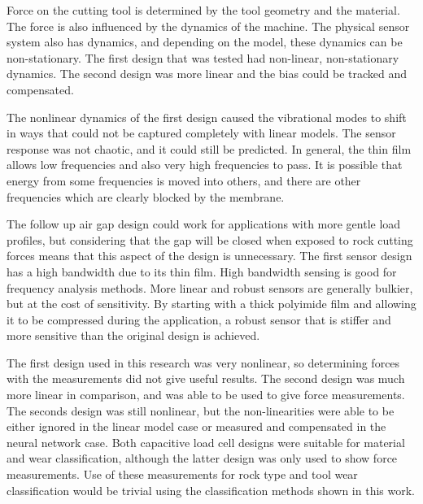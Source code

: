 Force on the cutting tool is determined by the tool geometry and the material.
The force is also influenced by the dynamics of the machine.
The physical sensor system also has dynamics, and depending on the model, 
these dynamics can be non-stationary.
The first design that was tested had non-linear, non-stationary dynamics.
The second design was more linear and the bias could be tracked and compensated.

The nonlinear dynamics of the first design caused the vibrational modes to shift
in ways that could not be captured completely with linear models.
The sensor response was not chaotic, and it could still be predicted.
In general, the thin film allows low frequencies and also very high frequencies to pass.
It is possible that energy from some frequencies is moved into others, and there
are other frequencies which are clearly blocked by the membrane.

The follow up air gap design could work for applications with more gentle load profiles,
but considering that the gap will be closed when exposed to rock cutting forces 
means that this aspect of the design is unnecessary. The first sensor design
has a high bandwidth due to its thin film. 
High bandwidth sensing is good for frequency analysis methods.
More linear and robust sensors are generally bulkier, but at the cost of sensitivity.
By starting with a thick polyimide film and allowing it to be compressed during the application,
 a robust sensor that is stiffer and more sensitive than the original design is achieved.

The first design used in this research was very nonlinear, so determining forces with the measurements
did not give useful results. The second design was much more linear in comparison, and was
able to be used to give force measurements.
The seconds design was still nonlinear, but the non-linearities were able to be either ignored in the linear
model case or measured and compensated in the neural network case.
Both capacitive load cell designs were suitable for material and wear classification, although the latter design
was only used to show force measurements. Use of these measurements for rock type and tool wear classification
would be trivial using the classification methods shown in this work.

